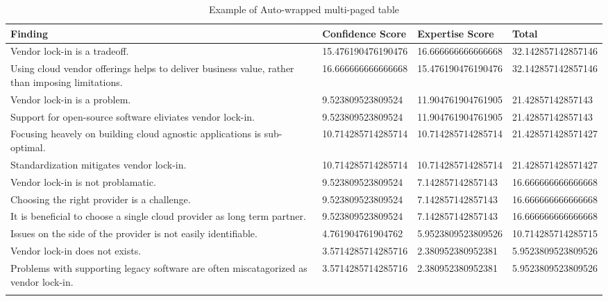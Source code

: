 
\renewcommand\arraystretch{1.5}%
\begin{longtable}{|p{10cm}|p{2cm}|p{2cm}|}
\hline
\textbf{Finding}  & \textbf{Confidence Score} & \textbf{Expertise Score} & \textbf{Total} \\ \hline
\endhead
Vendor lock-in is a tradeoff. & 15.476190476190476 & 16.666666666666668 & 32.142857142857146 \\ \hline
Using cloud vendor offerings helps to deliver business value, rather than imposing limitations. & 16.666666666666668 & 15.476190476190476 & 32.142857142857146 \\ \hline
Vendor lock-in is a problem. & 9.523809523809524 & 11.904761904761905 & 21.42857142857143 \\ \hline
Support for open-source software eliviates vendor lock-in. & 9.523809523809524 & 11.904761904761905 & 21.42857142857143 \\ \hline
Focusing heavely on building cloud agnostic applications is sub-optimal. & 10.714285714285714 & 10.714285714285714 & 21.428571428571427 \\ \hline
Standardization mitigates vendor lock-in. & 10.714285714285714 & 10.714285714285714 & 21.428571428571427 \\ \hline
Vendor lock-in is not problamatic. & 9.523809523809524 & 7.142857142857143 & 16.666666666666668 \\ \hline
Choosing the right provider is a challenge. & 9.523809523809524 & 7.142857142857143 & 16.666666666666668 \\ \hline
It is beneficial to choose a single cloud provider as long term partner. & 9.523809523809524 & 7.142857142857143 & 16.666666666666668 \\ \hline
Issues on the side of the provider is not easily identifiable. & 4.761904761904762 & 5.9523809523809526 & 10.714285714285715 \\ \hline
Vendor lock-in does not exists. & 3.5714285714285716 & 2.380952380952381 & 5.9523809523809526 \\ \hline
Problems with supporting legacy software are often miscatagorized as vendor lock-in. & 3.5714285714285716 & 2.380952380952381 & 5.9523809523809526 \\ \hline
\caption{Example of Auto-wrapped multi-paged table}
\label{tab:table1}
\end{longtable}
